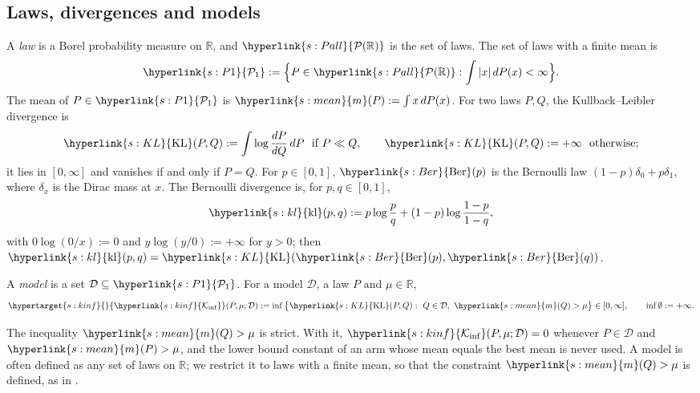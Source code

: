 \documentclass[11pt]{article}
\newcommand{\R}{\mathbb{R}}
\newcommand{\dt}[1]{\hypertarget{#1}{}}
\newcommand{\sy}[2]{{\hyperlink{#1}{#2}}}
\newcommand{\Pall}{\sy{s:Pall}{\mathcal{P}(\R)}}
\newcommand{\Pone}{\sy{s:P1}{\mathcal{P}_{1}}}
\newcommand{\mean}{\sy{s:mean}{m}}
\newcommand{\KL}{\sy{s:KL}{\mathrm{KL}}}
\newcommand{\kl}{\sy{s:kl}{\mathrm{kl}}}
\newcommand{\Ber}{\sy{s:Ber}{\mathrm{Ber}}}
\newcommand{\Kinf}{\sy{s:kinf}{\mathcal{K}_{\inf}}}
\begin{document}
\subsection{Laws, divergences and models}

\begin{definition}\label{def:laws}
\dt{s:Pall}A \emph{law} is a Borel probability measure on $\R$, and $\Pall$ is the set of laws.
\dt{s:P1}The set of laws with a finite mean is
\begin{equation*}
  \Pone:=\Big\{P\in\Pall:\int|x|\,dP(x)<\infty\Big\}.
\end{equation*}
\dt{s:mean}The mean of $P\in\Pone$ is $\mean(P):=\int x\,dP(x)$. \dt{s:KL}For two laws $P,Q$, the
Kullback--Leibler divergence is
\begin{equation*}
  \KL(P,Q):=\int\log\frac{dP}{dQ}\,dP\ \text{ if }P\ll Q,\qquad\KL(P,Q):=+\infty\ \text{ otherwise};
\end{equation*}
it lies in $[0,\infty]$ and vanishes if and only if $P=Q$. \dt{s:Ber}For $p\in[0,1]$, $\Ber(p)$ is
the Bernoulli law $(1-p)\delta_0+p\delta_1$, where $\delta_x$ is the Dirac mass at $x$.
\dt{s:kl}The Bernoulli divergence is, for $p,q\in[0,1]$,
\begin{equation*}
  \kl(p,q):=p\log\frac pq+(1-p)\log\frac{1-p}{1-q},
\end{equation*}
with $0\log(0/x):=0$ and $y\log(y/0):=+\infty$ for $y>0$; then $\kl(p,q)=\KL(\Ber(p),\Ber(q))$.
\end{definition}

\begin{definition}[$\Kinf$ of a model]\label{def:kinf}
A \emph{model} is a set $\mathcal D\subseteq\Pone$. For a model $\mathcal D$, a law $P$ and
$\mu\in\R$,
\begin{equation*}
  \dt{s:kinf}\Kinf(P,\mu;\mathcal D):=\inf\big\{\KL(P,Q):\ Q\in\mathcal D,\ \mean(Q)>\mu\big\}\in[0,\infty],
  \qquad\inf\emptyset:=+\infty.
\end{equation*}
\end{definition}

The inequality $\mean(Q)>\mu$ is strict. With it, $\Kinf(P,\mu;\mathcal D)=0$ whenever
$P\in\mathcal D$ and $\mean(P)>\mu$, and the lower bound constant of an arm whose mean equals the
best mean is never used. A model is often defined as any set of laws on $\R$; we restrict it to
laws with a finite mean, so that the constraint $\mean(Q)>\mu$ is defined, as in
\citet[Section~1.2]{GMS19}.
\end{document}
